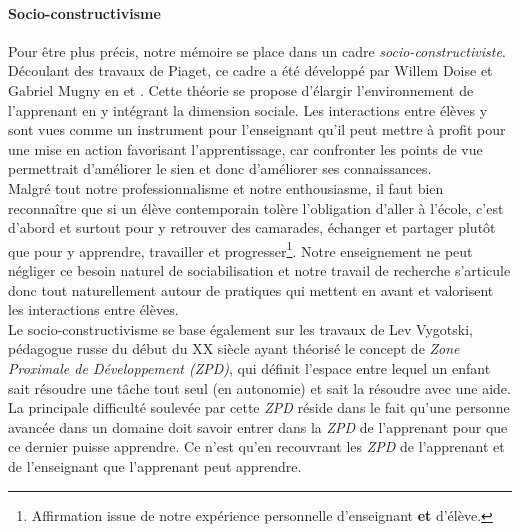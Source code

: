 \paragraph{Socio-constructivisme}
Pour être plus précis, notre mémoire se place dans un cadre \emph{socio-constructiviste}.
%
%
Découlant des travaux de Piaget, ce cadre a été développé par Willem Doise et Gabriel Mugny en \citeyear{doise_developpement_1981} et  \citeyear{doise_psychologie_1997}. Cette théorie se propose d'élargir l'environnement de l'apprenant en y intégrant la dimension sociale. Les interactions entre élèves y sont vues comme un instrument pour l'enseignant qu'il peut mettre à profit pour une mise en action favorisant l'apprentissage, car confronter les points de vue permettrait d'améliorer le sien et donc d'améliorer ses connaissances.
\\
Malgré tout notre professionnalisme et notre enthousiasme, il faut bien reconnaître que si un élève contemporain tolère l'obligation d'aller à l'école, c'est d'abord et surtout pour y retrouver des camarades, échanger et partager plutôt que pour y apprendre, travailler et progresser\footnote{Affirmation issue de notre expérience personnelle d'enseignant \textbf{et} d'élève.}.
%
Notre enseignement ne peut négliger ce besoin naturel de sociabilisation et notre travail de recherche s'articule donc tout naturellement autour de pratiques qui mettent en avant et valorisent les interactions entre élèves.
\\
Le socio-constructivisme se base également sur les travaux de Lev Vygotski, pédagogue russe du début du XX siècle ayant théorisé le concept de \textit{Zone Proximale de Développement (ZPD)}, qui définit l'espace entre lequel un enfant sait résoudre une tâche tout seul (en autonomie) et sait la résoudre avec une aide. La principale difficulté soulevée par cette \textit{ZPD} réside dans le fait qu'une personne avancée dans un domaine doit savoir entrer dans la \textit{ZPD} de l'apprenant pour que ce dernier puisse apprendre. Ce n'est qu'en recouvrant les \textit{ZPD} de l'apprenant et de l'enseignant que l'apprenant peut apprendre.





